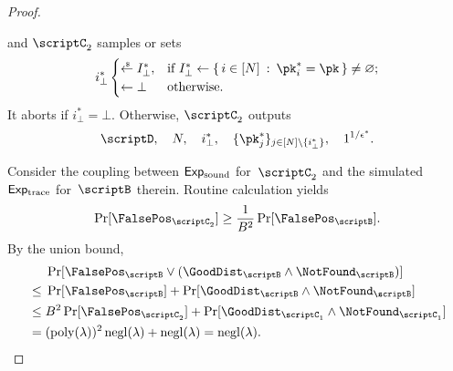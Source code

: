 \begin{proof}
\begin{itemize}
and $\scriptC_2$ samples or sets
\begin{align*}
i_\bot^\ast\begin{cases}
\draws I_\bot^\ast,&\textup{if }
I_\bot^\ast\gets
\{\,
{i\in[N]}
\::\:
{\pk_i^\ast=\pk}
\,\}\neq\varnothing;\\
\gets\bot&\textup{otherwise}.
\end{cases}
\end{align*}
It aborts if ${i_\bot^\ast=\bot}$.
Otherwise, $\scriptC_2$ outputs
\begin{align*}
\scriptD,\quad
N,\quad
i_\bot^\ast,\quad
\{\pk_j^\ast\}_{j\in{[N]\setminus{\{i_\bot^\ast\}}}},\quad
1^{1/\epsilon^\ast}.
\end{align*}
\end{itemize}
Consider the coupling between $\ExpSound$ for~$\scriptC_2$
and the simulated $\ExpTrace$ for~$\scriptB$ therein.
Routine calculation yields
\begin{align*}
\Pr[\FalsePos_{\scriptC_2}]
\geq\frac{1}{B^2}\Pr[\FalsePos_\scriptB].
\end{align*}
By the union bound,
\begin{align*}
&
\Pr[\FalsePos_\scriptB\vee(\GoodDist_\scriptB\wedge\NotFound_\scriptB)]
\\{}\leq{}&
\Pr[\FalsePos_\scriptB]
+
\Pr[\GoodDist_\scriptB\wedge\NotFound_\scriptB]
\\{}\leq{}&
B^2\Pr[\FalsePos_{\scriptC_2}]
+
\Pr[\GoodDist_{\scriptC_1}\wedge\NotFound_{\scriptC_1}]
\WideNarrow{}{\hspace*{-1em}}
\\{}={}&
(\poly(\lambda))^2\negl(\lambda)+\negl(\lambda)
=
\negl(\lambda).
\qedhere
\end{align*}
\end{proof}
